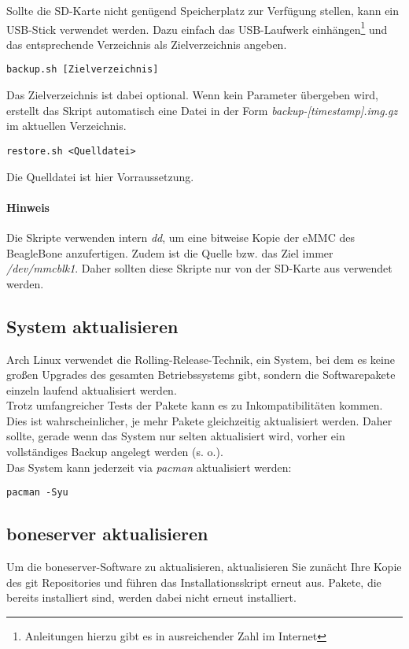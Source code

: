 Sollte die SD-Karte nicht genügend Speicherplatz zur Verfügung stellen, kann ein USB-Stick verwendet werden. Dazu einfach das USB-Laufwerk einhängen\footnote{Anleitungen hierzu gibt es in ausreichender Zahl im Internet} und das entsprechende Verzeichnis als Zielverzeichnis angeben.

\begin{lstlisting}
backup.sh [Zielverzeichnis]
\end{lstlisting}

Das Zielverzeichnis ist dabei optional. Wenn kein Parameter übergeben wird, erstellt das Skript automatisch eine Datei in der Form \textit{backup-[timestamp].img.gz} im aktuellen Verzeichnis.

\begin{lstlisting}
restore.sh <Quelldatei>
\end{lstlisting}

Die Quelldatei ist hier Vorraussetzung.

\paragraph{Hinweis} Die Skripte verwenden intern \emph{dd}, um eine bitweise Kopie der eMMC des BeagleBone anzufertigen. Zudem ist die Quelle bzw. das Ziel immer \textit{/dev/mmcblk1}. Daher sollten diese Skripte nur von der SD-Karte aus verwendet werden.


\subsection{System aktualisieren}
Arch Linux verwendet die Rolling-Release-Technik, ein System, bei dem es keine großen Upgrades des gesamten Betriebssystems gibt, sondern die Softwarepakete einzeln laufend aktualisiert werden.\\
Trotz umfangreicher Tests der Pakete kann es zu Inkompatibilitäten kommen. Dies ist wahrscheinlicher, je mehr Pakete gleichzeitig aktualisiert werden. Daher sollte, gerade wenn das System nur selten aktualisiert wird, vorher ein vollständiges Backup angelegt werden (s. o.).\\

Das System kann jederzeit via \emph{pacman} aktualisiert werden:

\begin{lstlisting}
pacman -Syu
\end{lstlisting}


\subsection{boneserver aktualisieren}
Um die boneserver-Software zu aktualisieren, aktualisieren Sie zunächt Ihre Kopie des git Repositories und führen das Installationsskript erneut aus. Pakete, die bereits installiert sind, werden dabei nicht erneut installiert.

